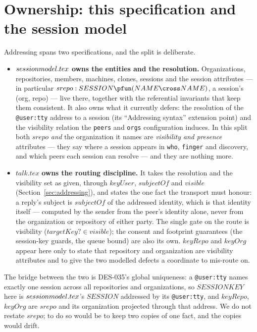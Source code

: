 \documentclass[a4paper,10pt,fleqn]{article}
\begin{document}
\section{Ownership: this specification and the session model}
\label{sec:ownership}

Addressing spans two specifications, and the split is deliberate.

\begin{itemize}
\item $session\-model.tex$ \textbf{owns the entities and the
  resolution.}  Organizations, repositories, members, machines, clones,
  sessions and the session attributes --- in particular $srepo :
  SESSION \pfun (NAME \cross NAME)$, a session's (org, repo) --- live
  there, together with the referential invariants that keep them
  consistent.  It also owns what it currently defers: the resolution of
  the \texttt{@user:tty} address to a session (its ``Addressing
  syntax'' extension point) and the visibility relation the
  \texttt{peers} and \texttt{orgs} configuration induces.  In this split
  both $srepo$ \emph{and} the organization it names are \emph{visibility
  and presence} attributes --- they say where a session appears in
  \texttt{who}, \texttt{finger} and discovery, and which peers each
  session can resolve --- and they are nothing more.

\item $talk.tex$ \textbf{owns the routing discipline.}  It takes the
  resolution and the visibility set as given, through $keyUser$,
  $subjectOf$ and $visible$ (Section~\ref{sec:addressing}), and states
  the one fact the transport must honour: a reply's subject is
  $subjectOf$ of the addressed identity, which is that identity itself
  --- computed by the sender from the peer's identity alone, never from
  the organization or repository of either party.  The single gate on
  the route is visibility ($targetKey? \in visible$); the consent and
  footprint guarantees (the session-key guards, the queue bound) are also
  its own.  $keyRepo$ and $keyOrg$ appear here only to state that
  repository and organization are visibility attributes and to give the
  two modelled defects a coordinate to mis-route on.
\end{itemize}

The bridge between the two is DES-035's global uniqueness: a
\texttt{@user:tty} names exactly one session across all repositories and
organizations, so $SESSIONKEY$ here is $session\-model.tex$'s $SESSION$
addressed by its \texttt{@user:tty}, and $keyRepo$, $keyOrg$ are $srepo$
and its organization projected through that address.  We do not restate
$srepo$; to do so would be to keep two copies of one fact, and the
copies would drift.
\end{document}
